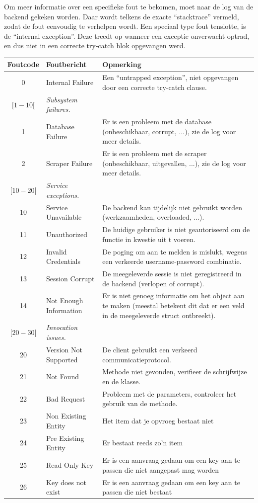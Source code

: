 Om meer informatie over een specifieke fout te bekomen, moet naar de log van de backend gekeken worden. Daar wordt telkens de exacte ``stacktrace'' vermeld, zodat de fout eenvoudig te verhelpen wordt. Een speciaal type fout tenslotte, is de ``internal exception''. Deze treedt op wanneer een exceptie onverwacht optrad, en dus niet in een correcte try-catch blok opgevangen werd.

\begin{table}
\begin{tabular}{| c p{4cm} p{7cm} |}
	\hline
	Foutcode & Foutbericht & Opmerking \\
	\hline
	
	0 & Internal Failure & Een ``untrapped exception'', niet opgevangen door een correcte try-catch clause. \\
	\hline
	
	$[1-10[$ & \emph{Subsystem failures.} & \\
	1 & Database Failure & Er is een probleem met de database (onbeschikbaar, corrupt, ...), zie de log voor meer details. \\
	2 & Scraper Failure & Er is een probleem met de scraper (onbeschikbaar, uitgevallen, ...), zie de log voor meer details. \\
	\hline
	
	$[10-20[$ & \emph{Service exceptions.} & \\
	10 & Service Unavailable & De backend kan tijdelijk niet gebruikt worden (werkzaamheden, overloaded, ...). \\
	11 & Unauthorized & De huidige gebruiker is niet geautoriseerd om de functie in kwestie uit t voeren. \\
	12 & Invalid Credentials & De poging om aan te melden is mislukt, wegens een verkeerde username-password combinatie. \\
	13 & Session Corrupt & De meegeleverde sessie is niet geregistreerd in de backend (verlopen of corrupt). \\
	14 & Not Enough Information & Er is niet genoeg informatie om het object aan te maken (meestal betekent dit dat er een veld in de meegeleverde struct ontbreekt). \\
	\hline
	
	$[20-30[$ & \emph{Invocation issues.} & \\
	20 & Version Not Supported & De client gebruikt een verkeerd communicatieprotocol. \\
	21 & Not Found & Methode niet gevonden, verifieer de schrijfwijze en de klasse. \\
	22 & Bad Request & Probleem met de parameters, controleer het gebruik van de methode. \\
	23 & Non Existing Entity & Het item dat je opvroeg bestaat niet \\
	24 & Pre Existing Entity & Er bestaat reeds zo'n item \\
	25 & Read Only Key & Er is een aanvraag gedaan om een key aan te passen die niet aangepast mag worden \\
	26 & Key does not exist & Er is een aanvraag gedaan om een key aan te passen die niet bestaat \\
	\hline


\end{tabular}
\end{table}
